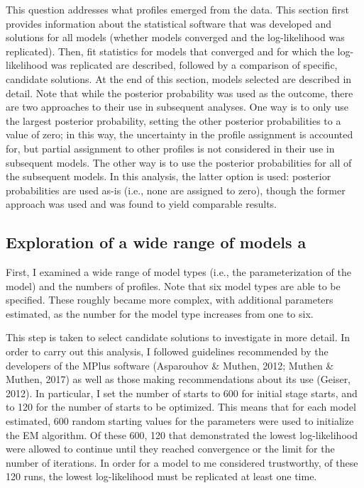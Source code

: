 \documentclass[]{book}
\theoremstyle{definition}
\theoremstyle{definition}
\theoremstyle{definition}
\theoremstyle{remark}
\begin{document}
This question addresses what profiles emerged from the data. This
section first provides information about the statistical software that
was developed and solutions for all models (whether models converged and
the log-likelihood was replicated). Then, fit statistics for models that
converged and for which the log-likelihood was replicated are described,
followed by a comparison of specific, candidate solutions. At the end of
this section, models selected are described in detail. Note that while
the posterior probability was used as the outcome, there are two
approaches to their use in subsequent analyses. One way is to only use
the largest posterior probability, setting the other posterior
probabilities to a value of zero; in this way, the uncertainty in the
profile assignment is accounted for, but partial assignment to other
profiles is not considered in their use in subsequent models. The other
way is to use the posterior probabilities for all of the subsequent
models. In this analysis, the latter option is used: posterior
probabilities are used as-is (i.e., none are assigned to zero), though
the former approach was used and was found to yield comparable results.

\subsection{Exploration of a wide range of models
a}\label{exploration-of-a-wide-range-of-models-a}

First, I examined a wide range of model types (i.e., the
parameterization of the model) and the numbers of profiles. Note that
six model types are able to be specified. These roughly became more
complex, with additional parameters estimated, as the number for the
model type increases from one to six.

This step is taken to select candidate solutions to investigate in more
detail. In order to carry out this analysis, I followed guidelines
recommended by the developers of the MPlus software (Asparouhov \&
Muthen, 2012; Muthen \& Muthen, 2017) as well as those making
recommendations about its use (Geiser, 2012). In particular, I set the
number of starts to 600 for initial stage starts, and to 120 for the
number of starts to be optimized. This means that for each model
estimated, 600 random starting values for the parameters were used to
initialize the EM algorithm. Of these 600, 120 that demonstrated the
lowest log-likelihood were allowed to continue until they reached
convergence or the limit for the number of iterations. In order for a
model to me considered trustworthy, of these 120 runs, the lowest
log-likelihood must be replicated at least one time.
\end{document}
